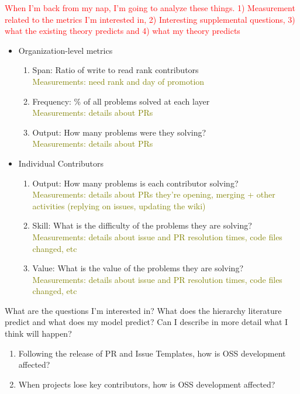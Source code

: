 \documentclass[12pt,notitlepage]{article}
\begin{document}
\textcolor{red}{When I'm back from my nap, I'm going to analyze these things. 1) Measurement related to the metrics I'm interested in, 2) Interesting supplemental questions, 3) what the existing theory predicts and 4) what my theory predicts}\\
\begin{itemize}
    \item Organization-level metrics
    \begin{enumerate}
        \item Span: Ratio of write to read rank contributors\\
        \textcolor{olive}{Measurements: need rank and day of promotion}
        \item Frequency: \% of all problems solved at each layer \\
        \textcolor{olive}{Measurements: details about PRs}
        \item Output: How many problems were they solving? \\ 
        \textcolor{olive}{Measurements: details about PRs}
    \end{enumerate}
    \item Individual Contributors
    \begin{enumerate}
        \item Output: How many problems is each contributor solving?\\
        \textcolor{olive}{Measurements: details about PRs they're opening, merging + other activities (replying on issues, updating the wiki)}
        \item Skill: What is the difficulty of the problems they are solving? \\
        \textcolor{olive}{Measurements: details about issue and PR resolution times, code files changed, etc} 
        \item Value: What is the value of the problems they are solving?\\
        \textcolor{olive}{Measurements: details about issue and PR resolution times, code files changed, etc}
    \end{enumerate}
\end{itemize}

What are the questions I'm interested in? What does the hierarchy literature predict and what does my model predict? Can I describe in more detail what I think will happen?

\begin{enumerate}
    \item Following the release of PR and Issue Templates, how is OSS development affected? 
    \item When projects lose key contributors, how is OSS development affected? 
\end{enumerate}
\end{document}
